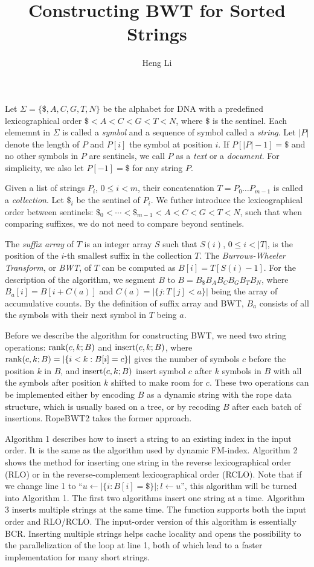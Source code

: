 \documentclass[10pt]{article}
\title{Constructing BWT for Sorted Strings}
\author{Heng Li}
\begin{document}
\maketitle

Let $\Sigma=\{\$,A,C,G,T,N\}$ be the alphabet for DNA with a predefined
lexicographical order $\$<A<C<G<T<N$, where $\$$ is the sentinel.  Each
elememnt in $\Sigma$ is called a \emph{symbol} and a sequence of symbol called
a \emph{string}. Let $|P|$ denote the length of $P$ and $P[i]$ the symbol at
position $i$. If $P[|P|-1]=\$$ and no other symbols in $P$ are sentinels, we
call $P$ as a \emph{text} or a \emph{document}. For simplicity, we also let
$P[-1]=\$$ for any string $P$.

Given a list of strings $P_i$, $0\le i<m$, their concatenation $T=P_0\ldots
P_{m-1}$ is called a \emph{collection}. Let $\$_i$ be the sentinel of $P_i$.
We futher introduce the lexicographical order between sentinels:
$\$_0<\cdots<\$_{m-1}<A<C<G<T<N$, such that when comparing suffixes, we do not
need to compare beyond sentinels.

The \emph{suffix array} of $T$ is an integer array $S$ such that $S(i)$, $0\le
i<|T|$, is the position of the $i$-th smallest suffix in the collection $T$.
The \emph{Burrows-Wheeler Transform}, or \emph{BWT}, of $T$ can be computed as
$B[i]=T[S(i)-1]$. For the description of the algorithm, we segment $B$ to
$B=B_{\$}B_AB_CB_GB_TB_N$, where $B_a[i]=B[i+C(a)]$ and $C(a)=|\{j:T[j]<a\}|$
being the array of accumulative counts. By the definition of suffix array and
BWT, $B_a$ consists of all the symbols with their next symbol in $T$ being
$a$.

Before we describe the algorithm for constructing BWT, we need two string
operations: ${\rm rank}(c,k;B)$ and ${\rm insert}(c,k;B)$, where ${\rm
rank}(c,k;B)=|\{i<k:B[i]=c\}|$ gives the number of symbols $c$ before the
position $k$ in $B$, and ${\rm insert}(c,k;B)$ insert symbol $c$ after $k$
symbols in $B$ with all the symbols after position $k$ shifted to
make room for $c$. These two operations can be implemented either by encoding
$B$ as a dynamic string with the rope data structure, which is usually based on
a tree, or by recoding $B$ after each batch of insertions. RopeBWT2 takes the
former approach.

Algorithm 1 describes how to insert a string to an existing index in the input
order. It is the same as the algorithm used by dynamic FM-index.  Algorithm 2
shows the method for inserting one string in the reverse lexicographical order
(RLO) or in the reverse-complement lexicographical order (RCLO). Note that if
we change line 1 to ``$u\gets|\{i:B[i]=\$\}|; l\gets u$'', this algorithm will
be turned into Algorithm 1. The first two algorithms insert one string at a
time. Algorithm 3 inserts multiple strings at the same time.  The function
supports both the input order and RLO/RCLO. The input-order version of this
algorithm is essentially BCR. Inserting multiple strings helps cache locality
and opens the possibility to the parallelization of the loop at line 1, both of
which lead to a faster implementation for many short strings.
\end{document}
